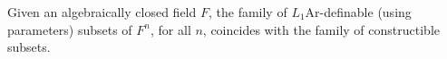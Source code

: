 Given an algebraically closed field $F$, the family of $L_1\text{Ar}$-definable (using parameters) subsets of $F^n$, for all $n$, coincides with the family of constructible subsets.
